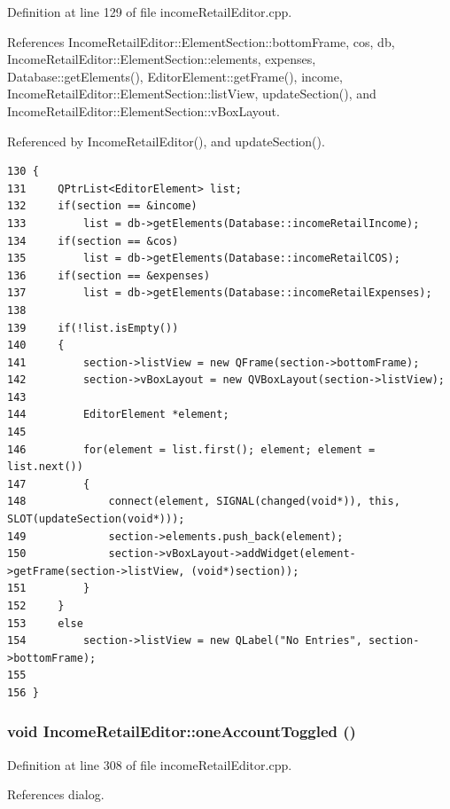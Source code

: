 Definition at line 129 of file income\-Retail\-Editor.cpp.

References Income\-Retail\-Editor::Element\-Section::bottom\-Frame, cos, db, Income\-Retail\-Editor::Element\-Section::elements, expenses, Database::get\-Elements(), Editor\-Element::get\-Frame(), income, Income\-Retail\-Editor::Element\-Section::list\-View, update\-Section(), and Income\-Retail\-Editor::Element\-Section::v\-Box\-Layout.

Referenced by Income\-Retail\-Editor(), and update\-Section().

\footnotesize\begin{verbatim}130 {
131     QPtrList<EditorElement> list;
132     if(section == &income)
133         list = db->getElements(Database::incomeRetailIncome);
134     if(section == &cos)
135         list = db->getElements(Database::incomeRetailCOS);
136     if(section == &expenses)
137         list = db->getElements(Database::incomeRetailExpenses);
138     
139     if(!list.isEmpty())
140     {
141         section->listView = new QFrame(section->bottomFrame);
142         section->vBoxLayout = new QVBoxLayout(section->listView);
143         
144         EditorElement *element;
145         
146         for(element = list.first(); element; element = list.next())
147         {
148             connect(element, SIGNAL(changed(void*)), this, SLOT(updateSection(void*)));
149             section->elements.push_back(element);
150             section->vBoxLayout->addWidget(element->getFrame(section->listView, (void*)section));
151         }
152     }
153     else
154         section->listView = new QLabel("No Entries", section->bottomFrame);
155     
156 }
\end{verbatim}\normalsize 


\hypertarget{classIncomeRetailEditor_k5}{
\subsubsection[oneAccountToggled]{\setlength{\rightskip}{0pt plus 5cm}void Income\-Retail\-Editor::one\-Account\-Toggled ()}}
\label{classIncomeRetailEditor_k5}


Definition at line 308 of file income\-Retail\-Editor.cpp.

References dialog.

